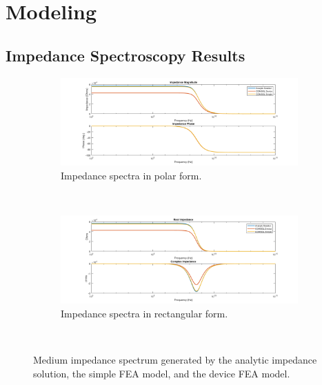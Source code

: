 \FloatBarrier

\section{Modeling}

\subsection{Impedance Spectroscopy Results}

\begin{figure}[h]
    \centering
    \begin{subfigure}[b]{\textwidth}
        \centering
        \includegraphics[width=\textwidth]{images/IS_model_medium_mag_phase.png}
        \caption{Impedance spectra in polar form.}
    \end{subfigure}
    \\
    \vspace{0.1 in}
    \begin{subfigure}[b]{\textwidth}
        \centering
        \includegraphics[width=\textwidth]{images/IS_model_medium_real_imag.png}
        \caption{Impedance spectra in rectangular form.}
    \end{subfigure}
    \\
    \vspace{0.1 in}
    \caption[Analyitic and FEA generated medium impedance spectrum]{Medium impedance spectrum generated by the analytic impedance solution, the simple FEA model, and the device FEA model.}
    \label{fig:medium_model_IS_data}
\end{figure}

